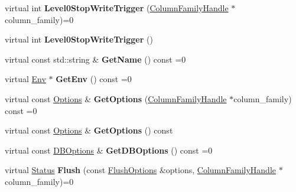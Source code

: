 \begin{DoxyCompactItemize}
\item 
virtual int {\bfseries Level0\+Stop\+Write\+Trigger} (\hyperlink{classrocksdb_1_1ColumnFamilyHandle}{Column\+Family\+Handle} $\ast$column\+\_\+family)=0\hypertarget{classrocksdb_1_1DB_a818ec586390892c14201b610ced44283}{}\label{classrocksdb_1_1DB_a818ec586390892c14201b610ced44283}

\item 
virtual int {\bfseries Level0\+Stop\+Write\+Trigger} ()\hypertarget{classrocksdb_1_1DB_aa9d8399659361a8d4d239d16f09d777c}{}\label{classrocksdb_1_1DB_aa9d8399659361a8d4d239d16f09d777c}

\item 
virtual const std\+::string \& {\bfseries Get\+Name} () const =0\hypertarget{classrocksdb_1_1DB_ad3dd1a5cbcd4161cc9b7aae7b0287406}{}\label{classrocksdb_1_1DB_ad3dd1a5cbcd4161cc9b7aae7b0287406}

\item 
virtual \hyperlink{classrocksdb_1_1Env}{Env} $\ast$ {\bfseries Get\+Env} () const =0\hypertarget{classrocksdb_1_1DB_aab78568f94216fcb321af22ee2803882}{}\label{classrocksdb_1_1DB_aab78568f94216fcb321af22ee2803882}

\item 
virtual const \hyperlink{structrocksdb_1_1Options}{Options} \& {\bfseries Get\+Options} (\hyperlink{classrocksdb_1_1ColumnFamilyHandle}{Column\+Family\+Handle} $\ast$column\+\_\+family) const =0\hypertarget{classrocksdb_1_1DB_aa8b1587fe656f511da075a5bc722fe27}{}\label{classrocksdb_1_1DB_aa8b1587fe656f511da075a5bc722fe27}

\item 
virtual const \hyperlink{structrocksdb_1_1Options}{Options} \& {\bfseries Get\+Options} () const\hypertarget{classrocksdb_1_1DB_a5ea0041b5bf31c38256152a698b6a6da}{}\label{classrocksdb_1_1DB_a5ea0041b5bf31c38256152a698b6a6da}

\item 
virtual const \hyperlink{structrocksdb_1_1DBOptions}{D\+B\+Options} \& {\bfseries Get\+D\+B\+Options} () const =0\hypertarget{classrocksdb_1_1DB_a3dc7a81072b8eaa75a785a3f7b094809}{}\label{classrocksdb_1_1DB_a3dc7a81072b8eaa75a785a3f7b094809}

\item 
virtual \hyperlink{classrocksdb_1_1Status}{Status} {\bfseries Flush} (const \hyperlink{structrocksdb_1_1FlushOptions}{Flush\+Options} \&options, \hyperlink{classrocksdb_1_1ColumnFamilyHandle}{Column\+Family\+Handle} $\ast$column\+\_\+family)=0\hypertarget{classrocksdb_1_1DB_afb62c428d9ffaf473bdd9ecc7568cfe5}{}\label{classrocksdb_1_1DB_afb62c428d9ffaf473bdd9ecc7568cfe5}


\end{DoxyCompactItemize}

